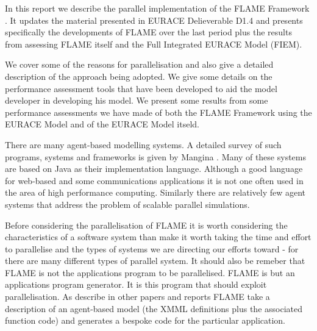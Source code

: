 In this report we describe the parallel implementation of the FLAME Framework \cite{Coakley}. It updates the material presented in EURACE Delieverable D1.4 and presents specifically the developments of FLAME over the last period plus the results from assessing FLAME itself and the Full Integrated EURACE Model (FIEM). 

We cover some of the reasons for parallelisation and also give a detailed description of the approach being adopted. We give some details on the performance assessment tools that have been developed to aid the model developer in developing his model. We present some results from some performance assessments we have made of both the FLAME Framework using the EURACE Model and of the EURACE Model itseld.

There are many agent-based modelling systems. A detailed survey of such programs, systems and frameworks is given by Mangina \cite{Mangina}. Many of these systems are based on Java as their implementation language. Although a good language for web-based and some communications applications it is not one often used in the area of high performance computing. Similarly there are relatively few agent systems that address the problem of scalable parallel simulations.

Before considering the parallelisation of FLAME it is worth considering the characteristics of a software system than make it worth taking the time and effort to parallelise and the types of systems we are directing our efforts toward - for there are many different types of parallel system. It should also be remeber that FLAME is not the applications program to be parallelised. FLAME is but an applications program generator. It is this program that should exploit parallelisation. As describe in other papers and reports FLAME take a description of an agent-based model (the XMML definitions plus the associated function code) and generates a bespoke code for the particular application.

